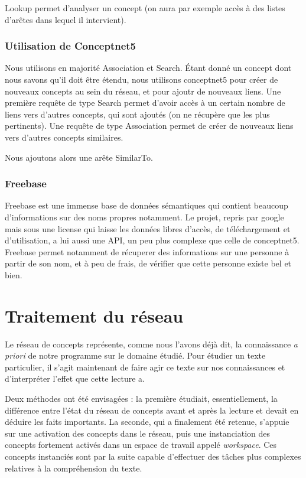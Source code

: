 \documentclass[a4paper,12pt]{article}
\begin{document}
Lookup permet d'analyser un concept (on aura par exemple accès à des listes d'arêtes dans lequel il intervient).


\subsubsection{Utilisation de Conceptnet5}

Nous utilisons en majorité Association et Search.
Étant donné un concept dont nous savons qu'il doit être étendu, nous utilisons conceptnet5 pour créer de nouveaux concepts au sein du réseau, et pour ajoutr de nouveaux liens. Une première requête de type Search permet d'avoir accès à un certain nombre de liens vers d'autres concepts, qui sont ajoutés (on ne récupère que les plus pertinents). Une requête de type Association permet de créer de nouveaux liens vers d'autres concepts similaires.

Nous ajoutons alors une arête SimilarTo.



    
\subsubsection{Freebase}

Freebase est une immense base de données sémantiques qui contient beaucoup d'informations sur des noms propres notamment. Le projet, repris par google mais sous une license qui laisse les données libres d'accès, de téléchargement et d'utilisation, a lui aussi une API, un peu plus complexe que celle de conceptnet5. Freebase permet notamment de récuperer des informations sur une personne à partir de son nom, et à peu de frais, de vérifier que cette personne existe bel et bien.

    
    

\section{Traitement du r\'eseau}

Le réseau de concepts représente, comme nous l'avons déjà dit, la connaissance \textit{a priori} de notre programme sur le domaine étudié. Pour étudier un texte particulier, il s'agit maintenant de faire agir ce texte sur nos connaissances et d'interpréter l'effet que cette lecture a.

Deux méthodes ont été envisagées : la première étudiait, essentiellement, la différence entre l'état du réseau de concepts avant et après la lecture et devait en déduire les faits importants. La seconde, qui a finalement été retenue, s'appuie sur une activation des concepts dans le réseau, puis une instanciation des concepts fortement activés dans un espace de travail appelé \textit{workspace}. Ces concepts instanciés sont par la suite capable d'effectuer des tâches plus complexes relatives à la compréhension du texte.
\end{document}
